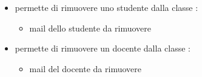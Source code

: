 \begin{itemize}
\newline
\item {}
\newline
permette di rimuovere uno studente dalla
classe
\newline
{} :
\begin{itemize}
\item {}
\newline
mail dello studente da rimuovere
\end{itemize}
\item {}
\newline
permette di rimuovere un docente dalla
classe
\newline
{} :
\begin{itemize}
\item {}
\newline
mail del docente da rimuovere
\end{itemize}
\end{itemize}

